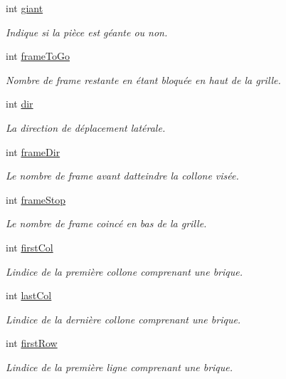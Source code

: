 \begin{DoxyCompactItemize}
int \hyperlink{struct_piece_ac3619bd3c5360a0979c7018a187107c0}{giant}
\begin{DoxyCompactList}\small\item\em Indique si la pièce est géante ou non. \end{DoxyCompactList}\item 
int \hyperlink{struct_piece_afab34d8939b7959fc2a95b4f05c38bbd}{frame\+To\+Go}
\begin{DoxyCompactList}\small\item\em Nombre de frame restante en étant bloquée en haut de la grille. \end{DoxyCompactList}\item 
int \hyperlink{struct_piece_a0d6d230858b211a68fbb4e410998a636}{dir}
\begin{DoxyCompactList}\small\item\em La direction de déplacement latérale. \end{DoxyCompactList}\item 
int \hyperlink{struct_piece_ac5dd791052ddb644af6904fe7bbf86d8}{frame\+Dir}
\begin{DoxyCompactList}\small\item\em Le nombre de frame avant d\textquotesingle{}atteindre la collone visée. \end{DoxyCompactList}\item 
int \hyperlink{struct_piece_a267d24f36baede2610b872e7e910ac29}{frame\+Stop}
\begin{DoxyCompactList}\small\item\em Le nombre de frame coincé en bas de la grille. \end{DoxyCompactList}\item 
int \hyperlink{struct_piece_a9ad7f55e97faf9230b2921295a8f18b5}{first\+Col}
\begin{DoxyCompactList}\small\item\em L\textquotesingle{}indice de la première collone comprenant une brique. \end{DoxyCompactList}\item 
int \hyperlink{struct_piece_a00c22a871e4431c2fe08184f13e96800}{last\+Col}
\begin{DoxyCompactList}\small\item\em L\textquotesingle{}indice de la dernière collone comprenant une brique. \end{DoxyCompactList}\item 
int \hyperlink{struct_piece_aa7a294ad71a4c69d0b0b83f5abafe066}{first\+Row}
\begin{DoxyCompactList}\small\item\em L\textquotesingle{}indice de la première ligne comprenant une brique. \end{DoxyCompactList}\item 

\end{DoxyCompactItemize}
